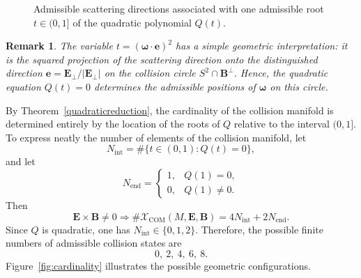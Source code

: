 \documentclass[10pt,a4paper]{amsart}
\newtheorem{remark}[theorem]{Remark}
\newcommand{\R}{\mathbb{R}}
\begin{document}
\begin{figure}[ht!]

\caption{Admissible scattering directions associated with one admissible root $t\in (0,1]$ of the quadratic polynomial $Q(t)$.}
\label{fig:vectors}
\end{figure}

\begin{remark}
The variable $t=({\bm\omega}\cdot{\bm e})^2$
has a simple geometric interpretation: it is the squared projection of the scattering direction onto the distinguished direction ${\bm e}={\bm E}_{\perp}/|{\bm E}_{\perp}|$
on the collision circle $S^2\cap{\bm B}^{\perp}$. Hence, the quadratic equation $Q(t)=0$ determines the admissible positions of ${\bm\omega}$ on this circle.
\end{remark}
By Theorem~\ref{quadraticreduction}, the cardinality of the collision manifold is determined entirely by the location of the roots of $Q$ relative to the interval $(0,1]$.
To express neatly the number of elements of the collision manifold,
let
\[
N_{\mathrm{int}}=\#\{t\in(0,1):Q(t)=0\},
\]
and let
\[
N_{\mathrm{end}}=
\begin{cases}
1, & Q(1)=0,\\
0, & Q(1)\neq0.
\end{cases}
\]
Then 
\[
{\bm E}\times{\bm B}\neq0 \Rightarrow \# \mathcal{X}_\mathrm{COM}(M,{\bm E}, {\bm B})= 4N_{\mathrm{int}}+2N_{\mathrm{end}}.
\]
Since $Q$ is quadratic, one has $N_{\mathrm{int}}\in\{0,1,2\}$.
Therefore, the possible finite numbers of admissible collision states are
\[
0,\ 2,\ 4,\ 6,\ 8.
\]
Figure~\ref{fig:cardinality} illustrates the possible geometric configurations.
\end{document}
